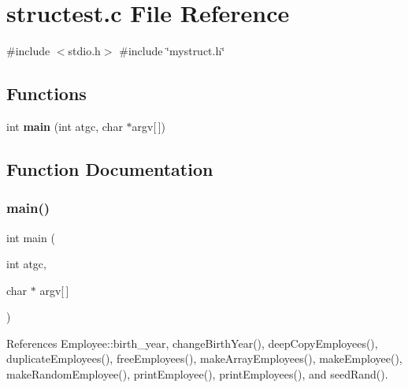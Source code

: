 \section{structest.\+c File Reference}
\label{structest_8c}
{\ttfamily \#include $<$stdio.\+h$>$}\newline
{\ttfamily \#include \char`\"{}mystruct.\+h\char`\"{}}\newline
\subsection*{Functions}
\begin{DoxyCompactItemize}
\item 
int \textbf{ main} (int atgc, char $\ast$argv[$\,$])
\end{DoxyCompactItemize}


\subsection{Function Documentation}
\mbox{\label{structest_8c_a5382d205c33bd6686f92c2e6e17dbffa}} 
\subsubsection{main()}
{\footnotesize\ttfamily int main (\begin{DoxyParamCaption}\item[{int}]{atgc,  }\item[{char $\ast$}]{argv[$\,$] }\end{DoxyParamCaption})}



References Employee\+::birth\+\_\+year, change\+Birth\+Year(), deep\+Copy\+Employees(), duplicate\+Employees(), free\+Employees(), make\+Array\+Employees(), make\+Employee(), make\+Random\+Employee(), print\+Employee(), print\+Employees(), and seed\+Rand().


